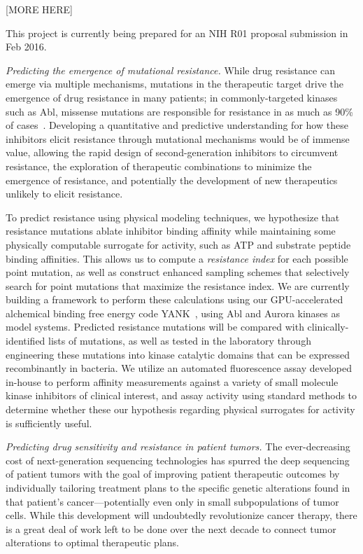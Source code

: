 \documentclass[10pt]{article}
\begin{document}
{\color{red}[MORE HERE]}

This project is currently being prepared for an NIH R01 proposal submission in Feb 2016.

\emph{Predicting the emergence of mutational resistance.}
While drug resistance can emerge via multiple mechanisms, mutations in the therapeutic target drive the emergence of drug resistance in many patients; in commonly-targeted kinases such as Abl, missense mutations are responsible for resistance in as much as 90\% of cases~\cite{sawyers:cancer-cell:2002:abl-resistance}.
Developing a quantitative and predictive understanding for how these inhibitors elicit resistance through mutational mechanisms would be of immense value, allowing the rapid design of second-generation inhibitors to circumvent resistance, the exploration of therapeutic combinations to minimize the emergence of resistance, and potentially the development of new therapeutics unlikely to elicit resistance.

To predict resistance using physical modeling techniques, we hypothesize that resistance mutations ablate inhibitor binding affinity while maintaining some physically computable surrogate for activity, such as ATP and substrate peptide binding affinities.
This allows us to compute a \emph{resistance index} for each possible point mutation, as well as construct enhanced sampling schemes that selectively search for point mutations that maximize the resistance index.
We are currently building a framework to perform these calculations using our GPU-accelerated alchemical binding free energy code YANK~\cite{yank}, using Abl and Aurora kinases as model systems.
Predicted resistance mutations will be compared with clinically-identified lists of mutations, as well as tested in the laboratory through engineering these mutations into kinase catalytic domains that can be expressed recombinantly in bacteria.
We utilize an automated fluorescence assay developed in-house to perform affinity measurements against a variety of small molecule kinase inhibitors of clinical interest, and assay activity using standard methods to determine whether these our hypothesis regarding physical surrogates for activity is sufficiently useful.

\emph{Predicting drug sensitivity and resistance in patient tumors.}
The ever-decreasing cost of next-generation sequencing technologies has spurred the deep sequencing of patient tumors with the goal of improving patient therapeutic outcomes by individually tailoring treatment plans to the specific genetic alterations found in that patient's cancer---potentially even only in small subpopulations of tumor cells.
While this development will undoubtedly revolutionize cancer therapy, there is a great deal of work left to be done over the next decade to connect tumor alterations to optimal therapeutic plans.
\end{document}

